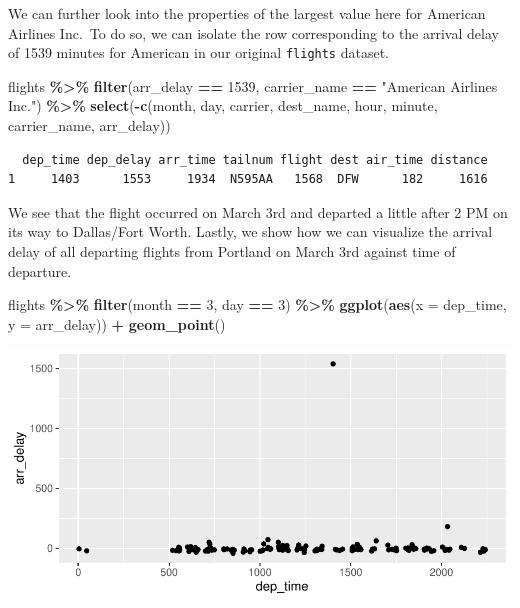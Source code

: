 \documentclass[12pt,twoside]{deuthesis}
\newenvironment{Shaded}{\begin{snugshade}}{\end{snugshade}}
\newcommand{\AttributeTok}[1]{\textcolor[rgb]{0.13,0.29,0.53}{#1}}
\newcommand{\DecValTok}[1]{\textcolor[rgb]{0.00,0.00,0.81}{#1}}
\newcommand{\FunctionTok}[1]{\textcolor[rgb]{0.13,0.29,0.53}{\textbf{#1}}}
\newcommand{\NormalTok}[1]{#1}
\newcommand{\SpecialCharTok}[1]{\textcolor[rgb]{0.81,0.36,0.00}{\textbf{#1}}}
\newcommand{\StringTok}[1]{\textcolor[rgb]{0.31,0.60,0.02}{#1}}
\begin{document}
We can further look into the properties of the largest value here for American Airlines Inc.~To do so, we can isolate the row corresponding to the arrival delay of 1539 minutes for American in our original \texttt{flights} dataset.
\begin{Shaded}
\begin{Highlighting}[]
\NormalTok{flights }\SpecialCharTok{\%\textgreater{}\%} \FunctionTok{filter}\NormalTok{(arr\_delay }\SpecialCharTok{==} \DecValTok{1539}\NormalTok{, }
\NormalTok{                  carrier\_name }\SpecialCharTok{==} \StringTok{"American Airlines Inc."}\NormalTok{) }\SpecialCharTok{\%\textgreater{}\%}
  \FunctionTok{select}\NormalTok{(}\SpecialCharTok{{-}}\FunctionTok{c}\NormalTok{(month, day, carrier, dest\_name, hour, }
\NormalTok{            minute, carrier\_name, arr\_delay))}
\end{Highlighting}
\end{Shaded}
\begin{verbatim}
  dep_time dep_delay arr_time tailnum flight dest air_time distance
1     1403      1553     1934  N595AA   1568  DFW      182     1616
\end{verbatim}
We see that the flight occurred on March 3rd and departed a little after 2 PM on its way to Dallas/Fort Worth. Lastly, we show how we can visualize the arrival delay of all departing flights from Portland on March 3rd against time of departure.
\begin{Shaded}
\begin{Highlighting}[]
\NormalTok{flights }\SpecialCharTok{\%\textgreater{}\%} \FunctionTok{filter}\NormalTok{(month }\SpecialCharTok{==} \DecValTok{3}\NormalTok{, day }\SpecialCharTok{==} \DecValTok{3}\NormalTok{) }\SpecialCharTok{\%\textgreater{}\%}
  \FunctionTok{ggplot}\NormalTok{(}\FunctionTok{aes}\NormalTok{(}\AttributeTok{x =}\NormalTok{ dep\_time, }\AttributeTok{y =}\NormalTok{ arr\_delay)) }\SpecialCharTok{+} \FunctionTok{geom\_point}\NormalTok{()}
\end{Highlighting}
\end{Shaded}
\includegraphics{BP_Rapor_files/figure-latex/march3plot-1.pdf}
\end{document}
